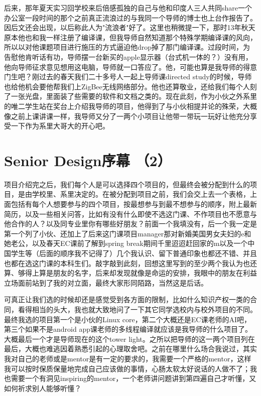 \documentclass[12pt]{book}
\begin{document}
后来，那年夏天实习回学校来后倍感孤独的自己与他和印度人三人共同share一个办公室一段时间的那个之前真正流浪过的与我同一个导师的博士也上台作报告了。因后文还会出现，以后称此人为"流浪者"好了。这里也稍微提一下，那时13年秋天原本他也和我一样注册了编译课，但我导师自然知道那个特殊学期编译课的风向，所以以对他课题项目进行施压的方式逼迫他drop掉了那门编译课。过段时间，为告慰他肯听话有功，导师摆一台新买的apple显示器（台式机一体的？）没有用，他向导师征求意见想用这电脑，导师就一口答应了。他，可能也算是我导师的得意门生吧？刚过去的春天我们二十多号人一起上导师课directed study的时候，导师也给他机会要他帮我们上ZigBee无线网络部分。他也还算敬业，还给我们每个人刻了一张光盘，里面装了些需要的软件和文档之类的。现在此刻，作为小伙之外系里的唯二学生站在奖台上介绍我导师的项目，他得到了与小伙相提并论的殊荣，大概像之前上课讲课一样，我导师又分了一两个小项目让他带一带玩一玩好让他充分享受一下作为系里大哥大的开心吧。
\section{Senior Design序幕  （2）}
\label{sec-13-2}
项目介绍完之后，我们每个人是可以选择四个项目的，但最终会被分配到什么的项目，是由学校里、系里决定的。在被分配到项目之前，我们会交上去一个表格，上面包括有每个人想要参与的四个项目，按最想参与到最不想参与的顺序，附上最新简历，以及一些相关问答，比如有没有什么即使不选这门课、不作项目也不愿意与他合作的人？以及同专业里你有哪些好朋友？前面一个我填没有，后一个我一定是第一个列了小伙、还加上了后来这门课项目manager那对新婚美国男女夫妇的e和她老公，以及春天EC课前了解到spring break期间千里迢迢赶回家的m以及一个中国学生等（后面的顺序我不记得了）几个我认识、留下普通印象也都还不错、并且也都在选这门课的本科生们。敲字敲到此刻，回想这里写到的至少两个我认为也还算、够得上算是朋友的名字，后来却发现就像是命运的安排，我眼中的朋友在利益立场面前站到了我的对立面，最终大家形同陌路，当然这是后话。

可真正让我们选的时候却还是感觉受到各方面的限制，比如什么知识产权一类的合同，看得相当的头大，我也就大致地问了一下其它同学选校内与校外项目的不同。最终我选的项目第一个是小伙的Linux core，第二个大概还是EC课老师的AI吧，第三个如果不是android app课老师的多线程编译就应该是我导师的什么项目了。大概最后一个才是导师现在的这个tower light。之所以把导师的这一两个项目列在最后，大概也难逃因着熟悉引起的心理取舍吧。之前在哪里什么场合我说过，其实我对自己的老师或是mentor是有一定的要求的，我需要一个严格的mentor，这样我可以按时保质保量地完成自己应该做的事情，心肠太软太好说话的人做不了；我也需要一个有洞见inspiring的mentor，一个老师讲问题讲到第四遍自己才听懂，又如何祈求别人能够听懂？
\end{document}
